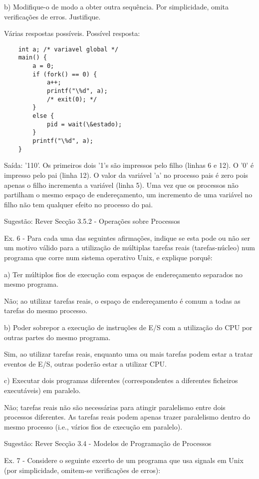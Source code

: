 \documentclass[11pt]{article}
\begin{document}
b) Modifique-o de modo a obter outra sequência. Por simplicidade, omita verificações de erros. Justifique.

Várias respostas possíveis. Possível resposta:

\begin{lstlisting}
    int a; /* variavel global */
    main() {
        a = 0;
        if (fork() == 0) {
            a++;
            printf("\%d", a);
            /* exit(0); */
        }
        else {
            pid = wait(\&estado);
        }
        printf("\%d", a);
    }
\end{lstlisting}

Saída: '110'. Os primeiros dois '1's são impressos pelo filho (linhas 6 e 12). O '0' é impresso pelo pai (linha 12). O valor da variável 'a' no processo pais é zero pois apenas o filho incrementa a variável (linha 5). Uma vez que os processos não partilham o mesmo espaço de endereçamento, um incremento de uma variável no filho não tem qualquer efeito no processo do pai.

Sugestão: Rever Secção 3.5.2 - Operações sobre Processos


Ex. 6 - Para cada uma das seguintes afirmações, indique se esta pode ou não ser um motivo válido para a utilização de múltiplas tarefas reais (tarefas-núcleo) num programa que corre num sistema operativo Unix, e explique porquê:

a) Ter múltiplos fios de execução com espaços de endereçamento separados no mesmo programa.

Não; ao utilizar tarefas reais, o espaço de endereçamento é comum a todas as tarefas do mesmo processo.

b) Poder sobrepor a execução de instruções de E/S com a utilização do CPU por outras partes do mesmo programa.

Sim, ao utilizar tarefas reais, enquanto uma ou mais tarefas podem estar a tratar eventos de E/S, outras poderão estar a utilizar CPU.

c) Executar dois programas diferentes (correspondentes a diferentes ficheiros executáveis) em paralelo.

Não; tarefas reais não são necessárias para atingir paralelismo entre dois processos diferentes. As tarefas reais podem apenas trazer paralelismo dentro do mesmo processo (i.e., vários fios de execução em paralelo).

Sugestão: Rever Secção 3.4 - Modelos de Programação de Processos


Ex. 7 - Considere o seguinte excerto de um programa que usa signals em Unix (por simplicidade, omitem-se verificações de erros):
\end{document}
